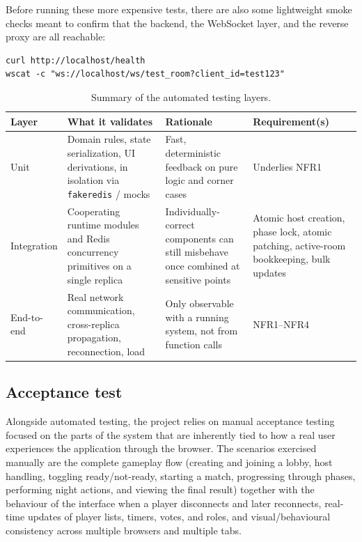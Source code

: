 \documentclass{scrartcl}
\begin{document}
Before running these more expensive tests, there are also some lightweight smoke checks meant to confirm that the backend, the WebSocket layer, and the reverse proxy are all reachable:

\begin{verbatim}
curl http://localhost/health
wscat -c "ws://localhost/ws/test_room?client_id=test123"
\end{verbatim}

\begin{table}
\centering
\small
\begin{tabular}{p{2.1cm} p{3.4cm} p{4.2cm} p{2.5cm}}
\hline
\textbf{Layer} & \textbf{What it validates} & \textbf{Rationale} & \textbf{Requirement(s)} \\
\hline
Unit & Domain rules, state serialization, UI derivations, in isolation via \texttt{fakeredis} / mocks & Fast, deterministic feedback on pure logic and corner cases & Underlies NFR1 \\
Integration & Cooperating runtime modules and Redis concurrency primitives on a single replica & Individually-correct components can still misbehave once combined at sensitive points & Atomic host creation, phase lock, atomic patching, active-room bookkeeping, bulk updates \\
End-to-end & Real network communication, cross-replica propagation, reconnection, load & Only observable with a running system, not from function calls & NFR1--NFR4 \\
\hline
\end{tabular}
\caption{Summary of the automated testing layers.}
\label{tab:test-summary}
\end{table}

\subsection{Acceptance test}

Alongside automated testing, the project relies on manual acceptance testing focused on the parts of the system that are inherently tied to how a real user experiences the application through the browser. The scenarios exercised manually are the complete gameplay flow (creating and joining a lobby, host handling, toggling ready/not-ready, starting a match, progressing through phases, performing night actions, and viewing the final result) together with the behaviour of the interface when a player disconnects and later reconnects, real-time updates of player lists, timers, votes, and roles, and visual/behavioural consistency across multiple browsers and multiple tabs.
\end{document}
